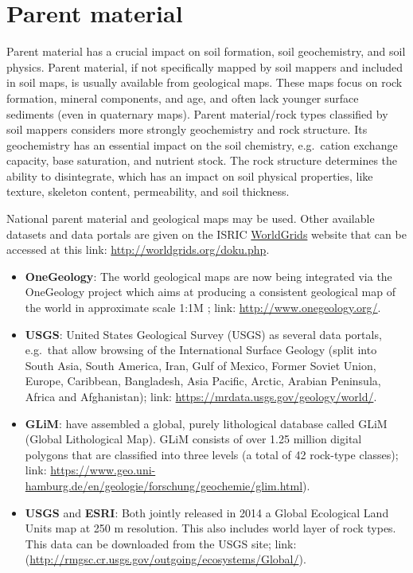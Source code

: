 \documentclass[10pt,b5paper,]{book}
\theoremstyle{definition}
\theoremstyle{definition}
\theoremstyle{definition}
\theoremstyle{remark}
\begin{document}
\hypertarget{parent-material}{%
\section{Parent material}\label{parent-material}}

Parent material has a crucial impact on soil formation, soil
geochemistry, and soil physics. Parent material, if not specifically
mapped by soil mappers and included in soil maps, is usually available
from geological maps. These maps focus on rock formation, mineral
components, and age, and often lack younger surface sediments (even in
quaternary maps). Parent material/rock types classified by soil mappers
considers more strongly geochemistry and rock structure. Its
geochemistry has an essential impact on the soil chemistry, e.g.~cation
exchange capacity, base saturation, and nutrient stock. The rock
structure determines the ability to disintegrate, which has an impact on
soil physical properties, like texture, skeleton content, permeability,
and soil thickness.

National parent material and geological maps may be used. Other
available datasets and data portals are given on the ISRIC
\href{http://worldgrids.org/doku.php}{WorldGrids} website that can be
accessed at this link: \url{http://worldgrids.org/doku.php}.

\begin{itemize}
\item
  \textbf{OneGeology}: The world geological maps are now being
  integrated via the OneGeology project which aims at producing a
  consistent geological map of the world in approximate scale 1:1M
  \citep{jackson2007onegeology}; link: \url{http://www.onegeology.org/}.
\item
  \textbf{USGS}: United States Geological Survey (USGS) as several data
  portals, e.g.~that allow browsing of the International Surface Geology
  (split into South Asia, South America, Iran, Gulf of Mexico, Former
  Soviet Union, Europe, Caribbean, Bangladesh, Asia Pacific, Arctic,
  Arabian Peninsula, Africa and Afghanistan); link:
  \url{https://mrdata.usgs.gov/geology/world/}.
\item
  \textbf{GLiM}: \citet{hartmann2012new} have assembled a global, purely
  lithological database called GLiM (Global Lithological Map). GLiM
  consists of over 1.25 million digital polygons that are classified
  into three levels (a total of 42 rock-type classes); link:
  \url{https://www.geo.uni-hamburg.de/en/geologie/forschung/geochemie/glim.html}).
\item
  \textbf{USGS} and \textbf{ESRI}: Both jointly released in 2014 a
  Global Ecological Land Units map at 250 m resolution. This also
  includes world layer of rock types. This data can be downloaded from
  the USGS site; link:
  (\url{http://rmgsc.cr.usgs.gov/outgoing/ecosystems/Global/}).
\end{itemize}
\end{document}
